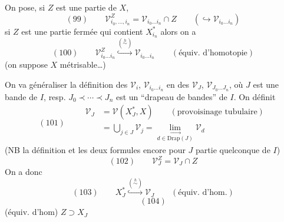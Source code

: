 
On pose, si $Z$ est une partie de $X$,
\[(99)\qquad\mathcal V_{i_0,\ldots,i_n}^{Z}=\mathcal V_{i_0\ldots i_n}\cap Z\qquad(\hookrightarrow\mathcal V_{i_0\ldots i_n})\]
si $Z$ est  une partie  fermée qui contient  $X_{i_n}^*$ 
\deleted{\[X_{i_n}-\dot X_{i_0}\qquad(\mathrm{NB}\ \dot X_{i_0}\overset{\mathrm{déf}}=X_{i_0}\setminus X_{i_0}^*=\bigcup_{i<i_0}X_i=\bigcup_{i<i_0}X_i^*)\]}
alors on a
\[(100)\qquad\mathcal V_{i_0\ldots i_n}^{Z}\overset{(\overset h\sim)}{\hookrightarrow}\mathcal V_{i_0\ldots i_n}\qquad(\text{équiv. d'homotopie})\]
(on suppose $X$ métrisable\ldots)

On va généraliser la définition des $\mathcal V_i$, $\mathcal V_{i_0\ldots i_n}$ en des $\mathcal V_J$, $\mathcal V_{J_0\ldots J_n}$, où $J$ est une bande de $I$, resp. $J_0\prec\cdots\prec J_n$ est un ``drapeau de bandes'' de $I$. On définit
\[
(101)\qquad\begin{aligned}
\mathcal V_J&=\mathcal V(X_J^*,X)\qquad(\text{provoisinage tubulaire})\\
&=\bigcup_{j\in J}\mathcal V_j=\underset{d\in\mathrm{Drap}(J)}{\lim_{\longrightarrow}}\mathcal V_d
\end{aligned}
\]
(NB la définition et les deux formules  encore pour $J$ partie quelconque de $I$)
\[(102)\qquad\mathcal V_J^Z=\mathcal V_J\cap Z\]
On a donc
\[(103)\qquad X_J^*\overset{(\overset h\sim)}{\hookrightarrow}\mathcal V_J\qquad(\text{équiv. d'hom.})\]
\[(104)\]
(équiv. d'hom)  $Z\supset X_J$
